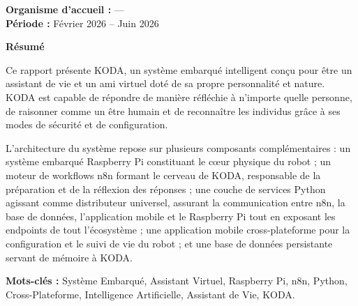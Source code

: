 \documentclass[a4paper,12pt]{report}
\begin{document}
\begin{titlepage}
\begin{center}
			\vfill
			
			{\fontsize{12}{15}\selectfont\textbf{Organisme d'accueil :} ---}\\[0.4cm]
			{\fontsize{12}{15}\selectfont\textbf{Période :} Février 2026 -- Juin 2026}\\[0.4cm]
			
			\vspace*{0.5cm}
		\end{center}
	\end{titlepage}
	
	\thispagestyle{preStyle}
	
	\vspace{1cm}
	\begin{center}
		{\fontsize{14}{17}\selectfont\bfseries Résumé}
	\end{center}
	
	\noindent
	Ce rapport présente KODA, un système embarqué intelligent conçu pour être un assistant de vie et un ami virtuel doté de sa propre personnalité et nature. KODA est capable de répondre de manière réfléchie à n'importe quelle personne, de raisonner comme un être humain et de reconnaître les individus grâce à ses modes de sécurité et de configuration.
	
	L'architecture du système repose sur plusieurs composants complémentaires : un système embarqué Raspberry Pi constituant le c\oe{}ur physique du robot ; un moteur de workflows n8n formant le cerveau de KODA, responsable de la préparation et de la réflexion des réponses ; une couche de services Python agissant comme distributeur universel, assurant la communication entre n8n, la base de données, l'application mobile et le Raspberry Pi tout en exposant les endpoints de tout l'écosystème ; une application mobile cross-plateforme pour la configuration et le suivi de vie du robot ; et une base de données persistante servant de mémoire à KODA.
	
	\vspace{0.5cm}
	\noindent\textbf{Mots-clés :} Système Embarqué, Assistant Virtuel, Raspberry Pi, n8n, Python, Cross-Plateforme, Intelligence Artificielle, Assistant de Vie, KODA.
	
\end{document}
